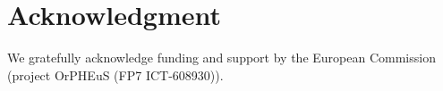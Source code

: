 \documentclass[a4paper,twoside]{article}
\begin{document}
\section*{Acknowledgment}
\noindent
We gratefully acknowledge funding and support by the European
Commission (project OrPHEuS (FP7 ICT-608930)).  




\end{document}

